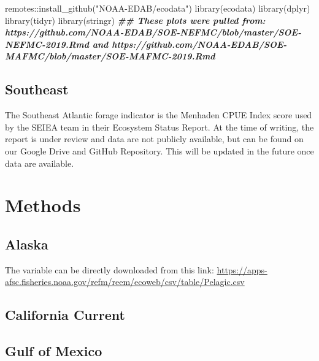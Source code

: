 \documentclass[
]{book}
\newenvironment{Shaded}{\begin{snugshade}}{\end{snugshade}}
\newcommand{\DocumentationTok}[1]{\textcolor[rgb]{0.56,0.35,0.01}{\textbf{\textit{#1}}}}
\newcommand{\FunctionTok}[1]{\textcolor[rgb]{0.00,0.00,0.00}{#1}}
\newcommand{\NormalTok}[1]{#1}
\newcommand{\SpecialCharTok}[1]{\textcolor[rgb]{0.00,0.00,0.00}{#1}}
\newcommand{\StringTok}[1]{\textcolor[rgb]{0.31,0.60,0.02}{#1}}
\begin{document}
\begin{Shaded}
\begin{Highlighting}[]
\NormalTok{remotes}\SpecialCharTok{::}\FunctionTok{install\_github}\NormalTok{(}\StringTok{"NOAA{-}EDAB/ecodata"}\NormalTok{)}
\FunctionTok{library}\NormalTok{(ecodata)}
\FunctionTok{library}\NormalTok{(dplyr)}
\FunctionTok{library}\NormalTok{(tidyr)}
\FunctionTok{library}\NormalTok{(stringr)}
\DocumentationTok{\#\# These plots were pulled from: https://github.com/NOAA{-}EDAB/SOE{-}NEFMC/blob/master/SOE{-}NEFMC{-}2019.Rmd and https://github.com/NOAA{-}EDAB/SOE{-}MAFMC/blob/master/SOE{-}MAFMC{-}2019.Rmd}
\end{Highlighting}
\end{Shaded}

\hypertarget{southeast}{%
\subsection{Southeast}\label{southeast}}

The Southeast Atlantic forage indicator is the Menhaden CPUE Index score used by the SEIEA team in their Ecosystem Status Report. At the time of writing, the report is under review and data are not publicly available, but can be found on our Google Drive and GitHub Repository. This will be updated in the future once data are available.

\hypertarget{methods-3}{%
\section{Methods}\label{methods-3}}

\hypertarget{alaska-1}{%
\subsection{Alaska}\label{alaska-1}}

The variable can be directly downloaded from this link: \url{https://apps-afsc.fisheries.noaa.gov/refm/reem/ecoweb/csv/table/Pelagic.csv}

\hypertarget{california-current-1}{%
\subsection{California Current}\label{california-current-1}}

\hypertarget{gulf-of-mexico-1}{%
\subsection{Gulf of Mexico}\label{gulf-of-mexico-1}}
\end{document}
